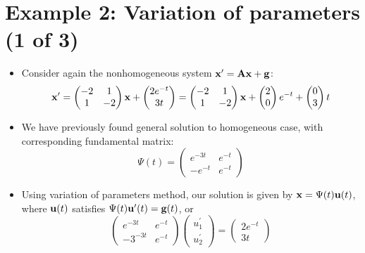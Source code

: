 \documentclass[11pt,a4paper]{article}
\begin{document}
	\section*{Example 2: Variation of parameters (1 of 3)}
	\begin{itemize}
		\item Consider again the nonhomogeneous system $\vb{x}^\prime = \vb{Ax} + \vb{g}$:
		$$
		\vb{x}^\prime =
		\begin{pmatrix}
			-2 & 1\\
			1 & -2
		\end{pmatrix}\vb{x} +
		\begin{pmatrix}
			2e^{-t}\\
			3t
		\end{pmatrix} =
		\begin{pmatrix}
			-2 & 1\\
			1 & -2
		\end{pmatrix}\vb{x} + 
		\begin{pmatrix}
			2\\
			0
		\end{pmatrix}e^{-t} + 
		\begin{pmatrix}
			0\\
			3
		\end{pmatrix}t
		$$
		\item We have previously found general solution to homogeneous case, with corresponding fundamental matrix:
		$$
		\Psi(t) =
		\begin{pmatrix}
			e^{-3t} & e^{-t}\\
			-e^{-t} & e^{-t}
		\end{pmatrix}
		$$
		\item Using variation of parameters method, our solution is given by $\vb{x} = \Psi(t)\vb{u}(t)$, where $\vb{u}(t)$ satisfies $\Psi(t)\vb{u}^\prime(t) = \vb{g}(t)$, or
		$$
		\begin{pmatrix}
			e^{-3t} & e^{-t}\\
			-3^{-3t} & e^{-t}
		\end{pmatrix}
		\begin{pmatrix}
			u_1^\prime\\
			u_2^\prime
		\end{pmatrix}=
		\begin{pmatrix}
			2e^{-t}\\
			3t
		\end{pmatrix}
		$$
	\end{itemize}
\end{document}
